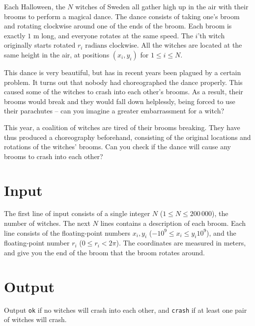 
\noindent
Each Halloween, the $N$ witches of Sweden all gather high up in the air with their brooms to perform a magical dance.
The dance consists of taking one's broom and rotating clockwise around one of the ends of the broom.
Each broom is exactly $1\text{ m}$ long, and everyone rotates at the same speed.
The $i$'th witch originally starts rotated $r_i\text{ radians}$ clockwise.
All the witches are located at the same height in the air, at positions $(x_i, y_i)$ for $1 \le i \le N$.

This dance is very beautiful, but has in recent years been plagued by a certain problem.
It turns out that nobody had choreographed the dance properly.
This caused some of the witches to crash into each other's brooms.
As a result, their brooms would break and they would fall down helplessly, being forced to use their parachutes -- can you imagine a greater embarrassment for a witch?

This year, a coalition of witches are tired of their brooms breaking.
They have thus produced a choreography beforehand, consisting of the original locations and rotations of the witches' brooms.
Can you check if the dance will cause any brooms to crash into each other?

\section*{Input}
The first line of input consists of a single integer $N$ ($1 \le N \le 200\,000$), the number of witches.
The next $N$ lines contains a description of each broom.
Each line consists of the floating-point numbers $x_i, y_i$ ($-10^{9} \le x_i \le y_i 10^{9}$), and the floating-point number $r_i$ ($0 \le r_i < 2\pi$).
The coordinates are measured in meters, and give you the end of the broom that the broom rotates around.

\section*{Output}
Output \texttt{ok} if no witches will crash into each other, and \texttt{crash} if at least one pair of witches will crash.
